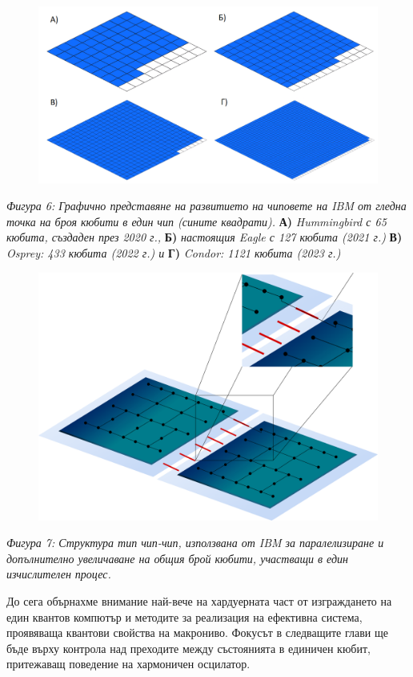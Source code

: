     \begin{figure}[H]
        \centering
        \includegraphics[width=430pt]{7.png}
    \end{figure}
    \begin{center}
        \small \textit{Фигура 6: Графично представяне на развитието на чиповете на IBM от гледна точка на броя кюбити в един чип (сините квадрати).} \textbf{А)} \textit{Hummingbird с 65 кюбита, създаден през 2020 г.,} \textbf{Б)}
        \textit{настоящия Eagle с 127 кюбита (2021 г.)} \textbf{В)} \textit{Osprey: 433 кюбита (2022 г.) и} \textbf{Г)} \textit{Condor: 1121 кюбита (2023 г.)}\\
    \end{center}

    \begin{figure}[H]
        \centering
        \includegraphics[width=330pt]{9.png}
    \end{figure}
    \begin{center}
        \small \textit{Фигура 7: Структура тип чип-чип, използвана от IBM за паралелизиране и допълнително увеличаване на общия брой кюбити, участващи в един изчислителен процес.}\\
    \end{center}

    До сега обърнахме внимание най-вече на хардуерната част от изграждането на един квантов компютър и методите за реализация на ефективна система, проявяваща квантови свойства на макрониво.
    Фокусът в следващите глави ще бъде върху контрола над преходите между състоянията в единичен кюбит, притежаващ поведение на хармоничен осцилатор.